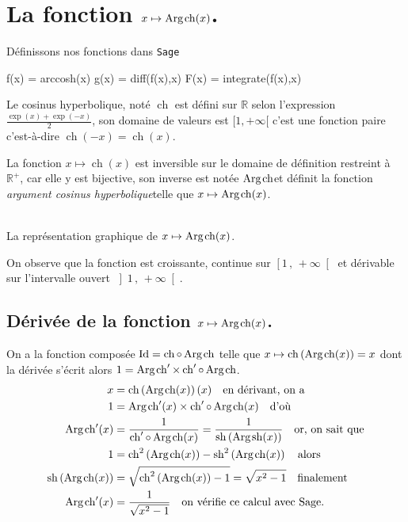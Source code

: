 \documentclass[a4paper,12pt]{report}
\def\eclaire{\mathbb}
\def\R{\ensuremath{\eclaire R}}
\def\Id{\ensuremath{\mathrm{Id}}}
\renewcommand{\sinh}{\mathop{\mathrm{sh}}}
\renewcommand{\cosh}{\mathop{\mathrm{ch}}}
\renewcommand{\arg}{\mathop{\mathrm{Arg}}}
\begin{document}

\section{La fonction  $x \mapsto \arg\mspace{-1mu}\cosh(x)$.}
Définissons nos fonctions dans {\texttt{Sage}}
\begin{sageblock}
    f(x) = arccosh(x)
    g(x) = diff(f(x),x)
    F(x) = integrate(f(x),x)
\end{sageblock}

Le cosinus hyperbolique, noté $\cosh$ est défini sur $\R$ selon l'expression $\frac{\exp(x)+\exp(-x)}{2}$, son domaine de valeurs est $[1, +\infty [$ 
c'est une fonction paire c'est-à-dire $\cosh(-x)=\cosh(x)$.


La fonction $x \mapsto \cosh(x)$ est inversible sur le domaine de définition restreint à $\R^+$, car elle y est bijective, son inverse est notée \og $ \arg\mspace{-1mu}\cosh $\fg et définit la fonction \og\emph{argument cosinus hyperbolique}\fg telle que $x \mapsto \arg\mspace{-1mu}\cosh(x)$.
\begin{center}
 \\
La représentation graphique de $x \mapsto \arg\mspace{-1mu}\cosh(x)$.
\end{center}
On observe que la fonction est croissante, continue sur $\left[1\,,\,+\infty \right[ $ et dérivable sur l'intervalle ouvert $\left]1\,,\,+\infty \right[ $.
                                                                                               

\subsection{Dérivée de la fonction $x \mapsto \arg\mspace{-1mu}\cosh(x)$.\label{argcosh}}
On a la fonction composée $\Id = \cosh \circ \arg\mspace{-1mu}\cosh$ telle que $x\mapsto\cosh\left(\arg\mspace{-1mu}\cosh(x)\right)=x$ dont la dérivée s'écrit alors $1= \arg\mspace{-1mu}\cosh\nolimits' \times \cosh\nolimits'\circ\arg\mspace{-1mu}\cosh$.
\begin{align*}
x & =\cosh\left(\arg\mspace{-1mu}\cosh(x)\right)(x) \quad \textrm{en dérivant, on a}\\
1 & = \arg\mspace{-1mu}\cosh\nolimits'(x) \times \cosh\nolimits'\circ\arg\mspace{-1mu}\cosh(x) \quad \textrm{d'où}\\
\arg\mspace{-1mu}\cosh\nolimits'(x) & =\frac{1}{ \cosh\nolimits'\circ\arg\mspace{-1mu}\cosh(x)}=\frac{1}{ \sinh\left(\arg\mspace{-1mu}\sinh(x)\right)}\quad \textrm{or, on sait que}\\
1 & = \cosh\nolimits^2\left(\arg\mspace{-1mu}\cosh(x)\right) - \sinh\nolimits^2\left(\arg\mspace{-1mu}\cosh(x)\right) \quad \textrm{alors}\\
\sinh\left(\arg\mspace{-1mu}\cosh(x)\right) & = \sqrt{\cosh\nolimits^2\left(\arg\mspace{-1mu}\cosh(x)\right)-1}=\sqrt{x^2-1}\quad \textrm{finalement}\\
\arg\mspace{-1mu}\cosh\nolimits'(x) & = \frac{1}{ \sqrt{x^2-1}}\quad \textrm{on vérifie ce calcul avec Sage.}
\end{align*}
\end{document}
